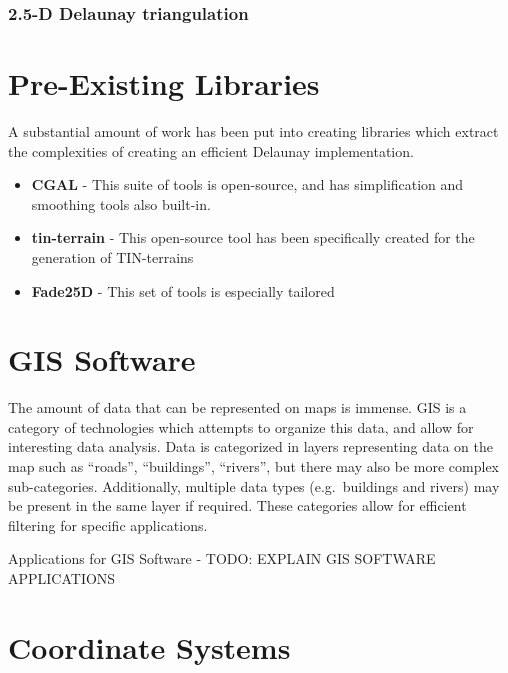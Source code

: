 \documentclass[
]{article}
\providecommand{\tightlist}{%
  \setlength{\itemsep}{0pt}\setlength{\parskip}{0pt}}
\begin{document}
\hypertarget{d-delaunay-triangulation}{%
\subsubsection{2.5-D Delaunay
triangulation}\label{d-delaunay-triangulation}}

\hypertarget{pre-existing-libraries}{%
\section{Pre-Existing Libraries}\label{pre-existing-libraries}}

A substantial amount of work has been put into creating libraries which
extract the complexities of creating an efficient Delaunay
implementation.

\begin{itemize}
\tightlist
\item
  \textbf{CGAL} - This suite of tools is open-source, and has
  simplification and smoothing tools also built-in.
\item
  \textbf{tin-terrain} - This open-source tool has been specifically
  created for the generation of TIN-terrains
\item
  \textbf{Fade25D} - This set of tools is especially tailored
\end{itemize}

\hypertarget{gis-software}{%
\section{GIS Software}\label{gis-software}}

The amount of data that can be represented on maps is immense. GIS is a
category of technologies which attempts to organize this data, and allow
for interesting data analysis. Data is categorized in layers
representing data on the map such as ``roads'', ``buildings'',
``rivers'', but there may also be more complex sub-categories.
Additionally, multiple data types (e.g.~buildings and rivers) may be
present in the same layer if required. These categories allow for
efficient filtering for specific applications.

Applications for GIS Software - TODO: EXPLAIN GIS SOFTWARE APPLICATIONS

\hypertarget{coordinate-systems}{%
\section{Coordinate Systems}\label{coordinate-systems}}
\end{document}
